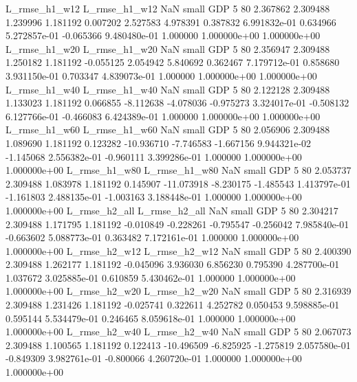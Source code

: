 L_rmse_h1_w12  L_rmse_h1_w12                   NaN      small      GDP                 5 80 2.367862       2.309488 1.239996       1.181192    0.007202      2.527583      4.978391     0.387832   6.991832e-01  0.634966 5.272857e-01    -0.065366   9.480480e-01            1.000000    1.000000e+00        1.000000e+00
 L_rmse_h1_w20  L_rmse_h1_w20                   NaN      small      GDP                 5 80 2.356947       2.309488 1.250182       1.181192   -0.055125      2.054942      5.840692     0.362467   7.179712e-01  0.858680 3.931150e-01     0.703347   4.839073e-01            1.000000    1.000000e+00        1.000000e+00
 L_rmse_h1_w40  L_rmse_h1_w40                   NaN      small      GDP                 5 80 2.122128       2.309488 1.133023       1.181192    0.066855     -8.112638     -4.078036    -0.975273   3.324017e-01 -0.508132 6.127766e-01    -0.466083   6.424389e-01            1.000000    1.000000e+00        1.000000e+00
 L_rmse_h1_w60  L_rmse_h1_w60                   NaN      small      GDP                 5 80 2.056906       2.309488 1.089690       1.181192    0.123282    -10.936710     -7.746583    -1.667156   9.944321e-02 -1.145068 2.556382e-01    -0.960111   3.399286e-01            1.000000    1.000000e+00        1.000000e+00
 L_rmse_h1_w80  L_rmse_h1_w80                   NaN      small      GDP                 5 80 2.053737       2.309488 1.083978       1.181192    0.145907    -11.073918     -8.230175    -1.485543   1.413797e-01 -1.161803 2.488135e-01    -1.003163   3.188448e-01            1.000000    1.000000e+00        1.000000e+00
 L_rmse_h2_all  L_rmse_h2_all                   NaN      small      GDP                 5 80 2.304217       2.309488 1.171795       1.181192   -0.010849     -0.228261     -0.795547    -0.256042   7.985840e-01 -0.663602 5.088773e-01     0.363482   7.172161e-01            1.000000    1.000000e+00        1.000000e+00
 L_rmse_h2_w12  L_rmse_h2_w12                   NaN      small      GDP                 5 80 2.400390       2.309488 1.262177       1.181192   -0.045096      3.936030      6.856230     0.795390   4.287700e-01  1.037672 3.025885e-01     0.610859   5.430462e-01            1.000000    1.000000e+00        1.000000e+00
 L_rmse_h2_w20  L_rmse_h2_w20                   NaN      small      GDP                 5 80 2.316939       2.309488 1.231426       1.181192   -0.025741      0.322611      4.252782     0.050453   9.598885e-01  0.595144 5.534479e-01     0.246465   8.059618e-01            1.000000    1.000000e+00        1.000000e+00
 L_rmse_h2_w40  L_rmse_h2_w40                   NaN      small      GDP                 5 80 2.067073       2.309488 1.100565       1.181192    0.122413    -10.496509     -6.825925    -1.275819   2.057580e-01 -0.849309 3.982761e-01    -0.800066   4.260720e-01            1.000000    1.000000e+00        1.000000e+00
